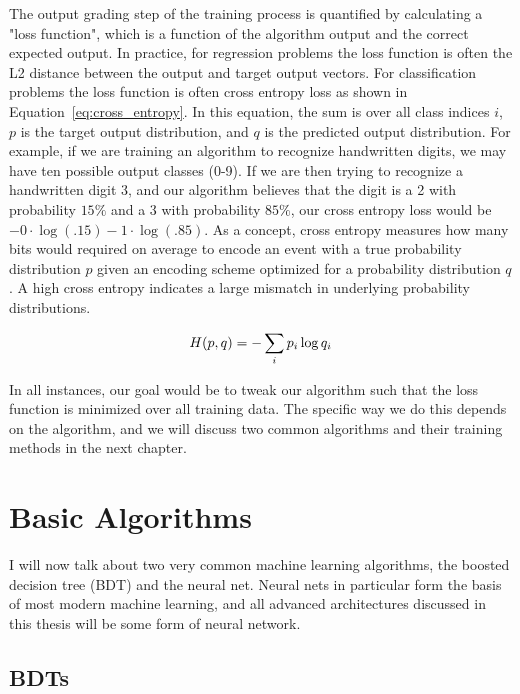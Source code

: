 The output grading step of the training process is quantified by calculating a "loss function", which is a function of the algorithm output and the correct expected output. In practice, for regression problems the loss function is often the L2 distance between the output and target output vectors. For classification problems the loss function is often cross entropy loss as shown in Equation~\ref{eq:cross_entropy}. In this equation, the sum is over all class indices $i$, $p$ is the target output distribution, and $q$ is the predicted output distribution. For example, if we are training an algorithm to recognize handwritten digits, we may have ten possible output classes (0-9). If we are then trying to recognize a handwritten digit 3, and our algorithm believes that the digit is a 2 with probability $15\%$ and a 3 with probability $85\%$, our cross entropy loss would be $-0\cdot\log(.15)-1\cdot\log(.85)$. As a concept, cross entropy measures how many bits would required on average to encode an event with a true probability distribution $p$ given an encoding scheme optimized for a probability distribution $q$. A high cross entropy indicates a large mismatch in underlying probability distributions.

\begin{equation}
\centering
H(p,q) = -\sum_{i} p_i \log q_i
\label{eq:cross_entropy}
\end{equation}

In all instances, our goal would be to tweak our algorithm such that the loss function is minimized over all training data. The specific way we do this depends on the algorithm, and we will discuss two common algorithms and their training methods in the next chapter.

\chapter{Basic Algorithms}

I will now talk about two very common machine learning algorithms, the boosted decision tree (BDT) and the neural net. Neural nets in particular form the basis of most modern machine learning, and all advanced architectures discussed in this thesis will be some form of neural network.

\section{BDTs}

